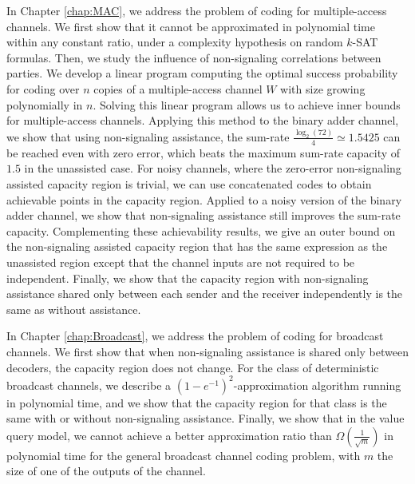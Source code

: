 In Chapter \ref{chap:MAC}, we address the problem of coding for multiple-access channels. We first show that it cannot be approximated in polynomial time within any constant ratio, under a complexity hypothesis on random $k$-SAT formulas. Then, we study the influence of non-signaling correlations between parties. We develop a linear program computing the optimal success probability for coding over $n$ copies of a multiple-access channel $W$ with size growing polynomially in $n$. Solving this linear program allows us to achieve inner bounds for multiple-access channels. Applying this method to the binary adder channel, we show that using non-signaling assistance, the sum-rate $\frac{\log_2(72)}{4} \simeq 1.5425$ can be reached even with zero error, which beats the maximum sum-rate capacity of $1.5$ in the unassisted case. For noisy channels, where the zero-error non-signaling assisted capacity region is trivial, we can use concatenated codes to obtain achievable points in the capacity region. Applied to a noisy version of the binary adder channel, we show that non-signaling assistance still improves the sum-rate capacity. Complementing these achievability results, we give an outer bound on the non-signaling assisted capacity region that has the same expression as the unassisted region except that the channel inputs are not required to be independent. Finally, we show that the capacity region with non-signaling assistance shared only between each sender and the receiver independently is the same as without assistance.

In Chapter \ref{chap:Broadcast}, we address the problem of coding for broadcast channels. We first show that when non-signaling assistance is shared only between decoders, the capacity region does not change. For the class of deterministic broadcast channels, we describe a $(1-e^{-1})^2$-approximation algorithm running in polynomial time, and we show that the capacity region for that class is the same with or without non-signaling assistance. Finally, we show that in the value query model, we cannot achieve a better approximation ratio than $\Omega\left(\frac{1}{\sqrt{m}}\right)$ in polynomial time for the general broadcast channel coding problem, with $m$ the size of one of the outputs of the channel.
